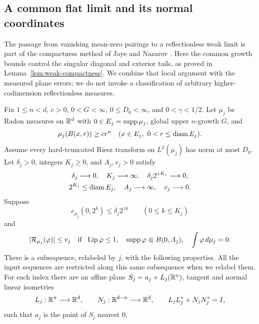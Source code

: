 \subsection{A common flat limit and its normal coordinates}

The passage from vanishing mean-zero pairings to a reflectionless weak
limit is part of the compactness method of Jaye and Nazarov
\cite{JayeNazarov2018I}. Here the common growth bounds control the
singular diagonal and exterior tails, as proved in
Lemma~\ref{lem:weak-compactness}. We combine that local argument with
the measured plane errors; we do not invoke a classification of
arbitrary higher-codimension reflectionless measures.

\begin{proposition}\label{prop:flat-limit}
Fix $1\le n<d$, $c>0$, $0<G<\infty$, $0\le D_0<\infty$, and
$0<\gamma<1/2$.  Let $\mu_j$ be Radon measures on $\mathbb R^d$ with
$0\in E_j=\operatorname{supp}\mu_j$, global upper $n$-growth $G$, and
\[
 \mu_j(B(x,r))\ge cr^n
 \quad(x\in E_j,\ 0<r\le\operatorname{diam} E_j).
\]
Assume every hard-truncated Riesz transform on $L^2(\mu_j)$ has norm at
most $D_0$.  Let $\delta_j>0$, integers $K_j\ge0$, and $A_j,v_j>0$
satisfy
\begin{equation}\label{eq:flat-limit-horizons}
 \begin{gathered}
 \delta_j\longrightarrow0,\quad K_j\longrightarrow\infty,\quad
 \delta_j2^{\gamma K_j}\longrightarrow0,\\
 2^{K_j}\le\operatorname{diam} E_j,\quad A_j\longrightarrow\infty,\quad v_j\longrightarrow0.
 \end{gathered}
\end{equation}
Suppose
\begin{equation}\label{eq:flat-limit-source-excess}
 e_{\mu_j}(0,2^k)\le\delta_j2^{\gamma k}
 \qquad(0\le k\le K_j)
\end{equation}
and
\begin{equation}\label{eq:flat-limit-source-oscillation}
 |\mathcal R_{\mu_j}(\varphi)|\le v_j
 \quad\text{if }\ \operatorname{Lip}\varphi\le1,\quad
 \operatorname{supp}\varphi\Subset B(0,A_j),\quad\int\varphi\,d\mu_j=0.
\end{equation}
There is a subsequence, relabeled by $j$, with the following properties.
All the input sequences are restricted along this same subsequence when
we relabel them.
For each index there are an affine plane
$S_j=a_j+L_j(\mathbb R^n)$, tangent and normal linear isometries
\[
 L_j:\mathbb R^n\longrightarrow\mathbb R^d,
 \qquad N_j:\mathbb R^{d-n}\longrightarrow\mathbb R^d,
 \qquad L_jL_j^*+N_jN_j^*=I,
\]
such that $a_j$ is the point of $S_j$ nearest $0$,

\end{proposition}
